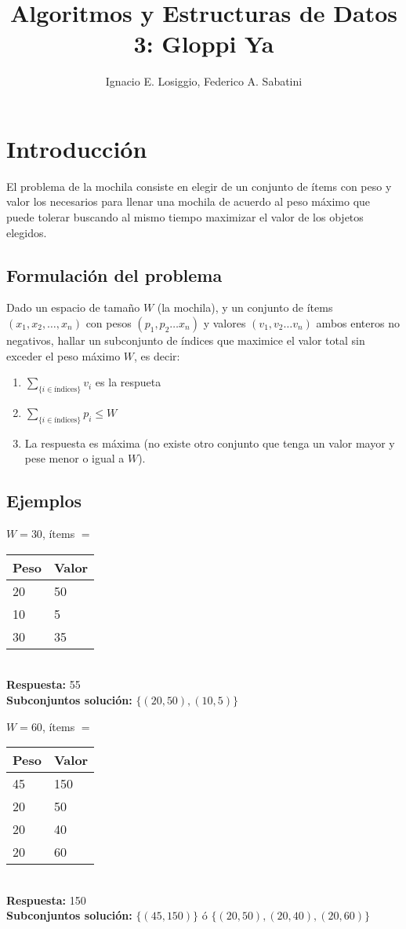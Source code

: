 \documentclass[fleqn, 11pt]{article}
\title{Algoritmos y Estructuras de Datos 3: Gloppi Ya}
\author{Ignacio E. Losiggio, Federico A. Sabatini}
\begin{document}
\maketitle

\tableofcontents

\section{Introducción}

El problema de la mochila consiste en elegir de un conjunto de ítems con peso y
valor los necesarios para llenar una mochila de acuerdo al peso máximo que
puede tolerar buscando al mismo tiempo maximizar el valor de los objetos
elegidos.

\subsection{Formulación del problema}

Dado un espacio de tamaño $W$ (la mochila), y un conjunto de ítems $(x_1, x_2,
\dots, x_n)$ con pesos $(p_1, p_2 \dots x_n)$ y valores $(v_1, v_2 \dots v_n)$
ambos enteros no negativos, hallar un subconjunto de índices que maximice el
valor total sin exceder el peso máximo $W$, es decir:

\begin{enumerate}
	\item $\sum_{\{i \in \text{índices}\}} v_i$ es la respueta
	\item $\sum_{\{i \in \text{índices}\}} p_i \le W$
	\item La respuesta es máxima (no existe otro conjunto que tenga un
	valor mayor y  pese menor o igual a $W$).
\end{enumerate}

\subsection{Ejemplos}

$W = 30$, ítems $=$
\begin{tabular}{l l}
	Peso  & Valor \\ \toprule
	20 & 50 \\
	10 & 5  \\
	30 & 35
\end{tabular} \\
\textbf{Respuesta:} 55 \\
\textbf{Subconjuntos solución:} $\{(20,50), (10,5)\}$

$W = 60$, ítems $=$
\begin{tabular}{l l}
	Peso & Valor \\ \toprule
	45 & 150 \\
	20 & 50 \\
	20 & 40 \\
	20 & 60
\end{tabular} \\
\textbf{Respuesta:} 150 \\
\textbf{Subconjuntos solución:} $\{(45, 150)\}$ ó $\{(20, 50), (20, 40), (20,
60)\}$
\end{document}
